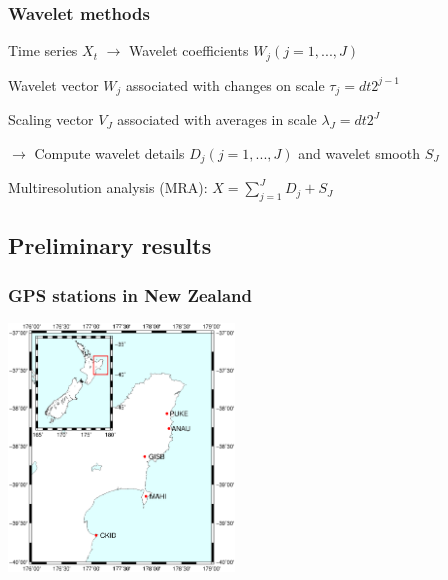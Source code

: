 \documentclass{beamer}
\begin{document}
	\begin{frame}
		\frametitle{Wavelet methods}
		Time series $X_t$ $\rightarrow$ Wavelet coefficients $W_j (j = 1, ... , J)$

		\vspace{1em}

		Wavelet vector $W_j$ associated with changes on scale $\tau_j = dt 2^{j-1}$

		\vspace{1em}

		Scaling vector $V_J$ associated with averages in scale $\lambda_J = dt 2^J$

		\vspace{1em}

		$\rightarrow$ Compute wavelet details $D_j (j = 1, ... , J)$ and wavelet smooth $S_J$

		\vspace{1em}

		Multiresolution analysis (MRA): $X = \sum_{j = 1}^J D_j + S_J$
	\end{frame}


	\subsection{Preliminary results}

	\begin{frame}
		\frametitle{GPS stations in New Zealand}
		\begin{center}
			\includegraphics[trim={1cm 3cm 2cm 6cm}, clip, width=6cm]{Hikurangi/studyarea.eps}
		\end{center}
	\end{frame}
\end{document}
